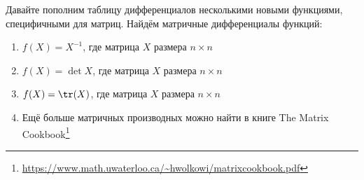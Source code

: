 \begin{problem}{}
Давайте пополним таблицу дифференциалов несколькими новыми функциями, специфичными для матриц. Найдём матричные дифференциалы функций: 
\begin{enumerate}
		\item $f(X) = X^{-1}$, где матрица $X$ размера $n \times n$
		
		\item  $f(X) = \det X$, где матрица $X$ размера $n \times n$
		
		\item $f(X) = \tr(X)$, где матрица $X$ размера $n \times n$
		
		\item Ещё больше матричных производных можно найти в книге The Matrix Cookbook\footnote{\url{https://www.math.uwaterloo.ca/~hwolkowi/matrixcookbook.pdf}}
	\end{enumerate}
\end{problem} 

